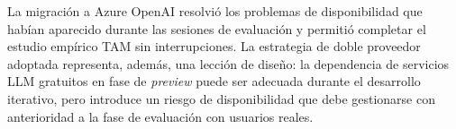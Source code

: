 La migración a Azure OpenAI resolvió los problemas de disponibilidad que habían aparecido durante las sesiones de evaluación y permitió completar el estudio empírico TAM sin interrupciones. La estrategia de doble proveedor adoptada representa, además, una lección de diseño: la dependencia de servicios LLM gratuitos en fase de \textit{preview} puede ser adecuada durante el desarrollo iterativo, pero introduce un riesgo de disponibilidad que debe gestionarse con anterioridad a la fase de evaluación con usuarios reales.

